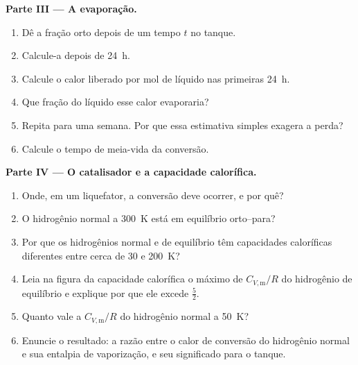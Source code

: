 \begin{problem}
\medskip\noindent\textbf{Parte III --- A evaporação.}
\begin{enumerate}[resume]
  \item Dê a fração orto depois de um tempo $t$ no tanque.
  \item Calcule-a depois de \qty{24}{h}.
  \item Calcule o calor liberado por mol de líquido nas primeiras \qty{24}{h}.
  \item Que fração do líquido esse calor evaporaria?
  \item Repita para uma semana. Por que essa estimativa simples exagera a perda?
  \item Calcule o tempo de meia-vida da conversão.
\end{enumerate}

\medskip\noindent\textbf{Parte IV --- O catalisador e a capacidade calorífica.}
\begin{enumerate}[resume]
  \item Onde, em um liquefator, a conversão deve ocorrer, e por quê?
  \item O hidrogênio normal a \qty{300}{K} está em equilíbrio orto--para?
  \item Por que os hidrogênios normal e de equilíbrio têm capacidades caloríficas
        diferentes entre cerca de 30 e \qty{200}{K}?
  \item Leia na figura da capacidade calorífica o máximo de $C_{V,\mathrm m}/R$ do
        hidrogênio de equilíbrio e explique por que ele excede $\frac52$.
  \item Quanto vale a $C_{V,\mathrm m}/R$ do hidrogênio normal a \qty{50}{K}?
  \item Enuncie o resultado: a razão entre o calor de conversão do hidrogênio normal
        e sua entalpia de vaporização, e seu significado para o tanque.
\end{enumerate}
\end{problem}
